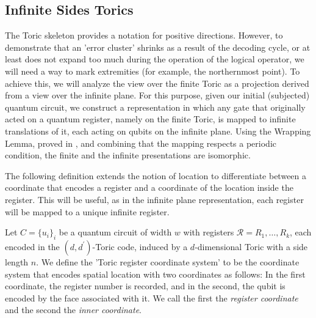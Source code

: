 \subsection{Infinite Sides Torics}
\label{subsection:infinitetoric}
The Toric skeleton provides a notation for positive directions. However, to demonstrate that an 'error cluster' shrinks as a result of the decoding cycle, or at least does not expand too much during the operation of the logical operator, we will need a way to mark extremities (for example, the northernmost point). To achieve this, we will analyze the view over the finite Toric as a projection derived from a view over the infinite plane. For this purpose, given our initial (subjected) quantum circuit, we construct a representation in which any gate that originally acted on a quantum register, namely on the finite Toric, is mapped to infinite translations of it, each acting on qubits on the infinite plane. Using the Wrapping Lemma, proved in \cite{schumacher2004reversiblequantumcellularautomata}, and combining that the mapping respects a periodic condition, the finite and the infinite presentations are isomorphic.







The following definition extends the notion of location to differentiate between a coordinate that encodes a register and a coordinate of the location inside the register. This will be useful, as in the infinite plane representation, each register will be mapped to a unique infinite register. %
\begin{definition}
Let $C=\{u_i\}_i$ be a quantum circuit of width $w$ with registers $\mathcal{R}=R_{1},\ldots,R_{k}$, each encoded in the $(d,d^{\prime})$-Toric code, induced by a $d$-dimensional Toric with a side length $n$. We define the 'Toric register coordinate system' to be the coordinate system that encodes spatial location with two coordinates as follows: In the first coordinate, the register number is recorded, and in the second, the qubit is encoded by the face associated with it. We call the first the \textit{register coordinate} and the second the \textit{inner coordinate}.
\end{definition}


